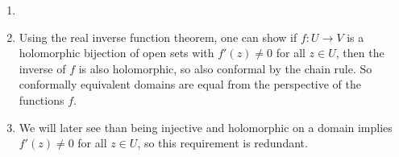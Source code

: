 \documentclass[12pt]{article}
\begin{document}
\begin{remark}
	\begin{enumerate}[1.]
		\item[]
		\item Using the real inverse function theorem, one can show if $f : U \to V$ is a holomorphic bijection of open sets with $f'(z) \neq 0$ for all $z \in U$, then the inverse of $f$ is also holomorphic, so also conformal by the chain rule. So conformally equivalent domains are equal from the perspective of the functions $f$.
		\item We will later see than being injective and holomorphic on a domain implies $f'(z) \neq 0$ for all $z \in U$, so this requirement is redundant.
	\end{enumerate}	
\end{remark}
\end{document}
